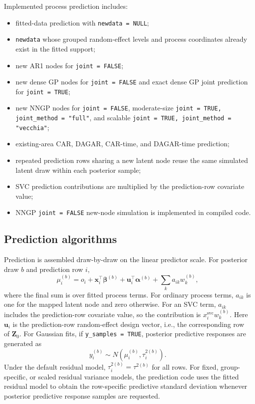\documentclass[11pt]{article}
\newcommand{\balpha}{\bm{\alpha}}
\newcommand{\bbeta}{\bm{\beta}}
\newcommand{\bu}{\bm{u}}
\newcommand{\bx}{\bm{x}}
\newcommand{\bZ}{\bm{Z}}
\newcommand{\trans}{^\top}
\begin{document}
Implemented process prediction includes:
\begin{itemize}
\item fitted-data prediction with \texttt{newdata = NULL};
\item \texttt{newdata} whose grouped random-effect levels and process coordinates already exist in the fitted support;
\item new AR1 nodes for \texttt{joint = FALSE};
\item new dense GP nodes for \texttt{joint = FALSE} and exact dense GP joint prediction for \texttt{joint = TRUE};
\item new NNGP nodes for \texttt{joint = FALSE}, moderate-size \texttt{joint = TRUE, joint\_method = "full"}, and scalable \texttt{joint = TRUE, joint\_method = "vecchia"};
\item existing-area CAR, DAGAR, CAR-time, and DAGAR-time prediction;
\item repeated prediction rows sharing a new latent node reuse the same simulated latent draw within each posterior sample;
\item SVC prediction contributions are multiplied by the prediction-row covariate value;
\item NNGP \texttt{joint = FALSE} new-node simulation is implemented in compiled code.
\end{itemize}

\subsection{Prediction algorithms}

Prediction is assembled draw-by-draw on the linear predictor scale. For posterior draw $b$ and prediction row $i$,
\begin{equation}
  \mu_i^{(b)} = o_i + \bx_i\trans \bbeta^{(b)} + \bu_i\trans \balpha^{(b)}
    + \sum_k a_{ik} w_k^{(b)} ,
\end{equation}
where the final sum is over fitted process terms. For ordinary process terms, $a_{ik}$ is one for the mapped latent node and zero otherwise. For an SVC term, $a_{ik}$ includes the prediction-row covariate value, so the contribution is $x_i^{\mathrm{svc}} w_k^{(b)}$. Here $\bu_i$ is the prediction-row random-effect design vector, i.e., the corresponding row of $\bZ_0$. For Gaussian fits, if \texttt{y\_samples = TRUE}, posterior predictive responses are generated as
\begin{equation}
  y_i^{(b)} \sim N(\mu_i^{(b)}, \tau_i^{2(b)}).
\end{equation}
Under the default residual model, $\tau_i^{2(b)}=\tau^{2(b)}$ for all rows. For fixed, group-specific, or scaled residual variance models, the prediction code uses the fitted residual model to obtain the row-specific predictive standard deviation whenever posterior predictive response samples are requested.
\end{document}
